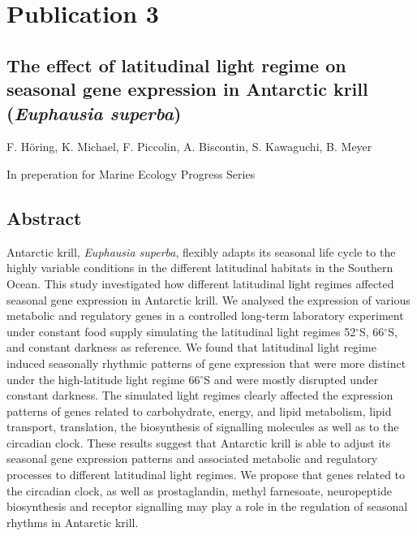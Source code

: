 
\chapter[Publication 3]{Publication 3} %

\label{ChapterX} %
\section*{The effect of latitudinal light regime on seasonal gene expression in Antarctic krill (\textit{Euphausia superba})}

F. Höring, K. Michael, F. Piccolin, A. Biscontin, S. Kawaguchi, B. Meyer

In preperation for Marine Ecology Progress Series

\section{Abstract}

Antarctic krill, \textit{Euphausia superba}, flexibly adapts its seasonal life
cycle to the highly variable conditions in the different latitudinal habitats
in the Southern Ocean. This study investigated how different latitudinal light
regimes affected seasonal gene expression in Antarctic krill. We analysed the
expression of various metabolic and regulatory genes in a controlled long-term
laboratory experiment under constant food supply simulating the latitudinal
light regimes 52$^{\circ}$S, 66$^{\circ}$S, and constant darkness as reference.
We found that latitudinal light regime induced seasonally rhythmic patterns of
gene expression that were more distinct under the high-latitude light regime
66$^{\circ}$S and were mostly disrupted under constant darkness. The simulated
light regimes clearly affected the expression patterns of genes related to
carbohydrate, energy, and lipid metabolism, lipid transport, translation, the
biosynthesis of signalling molecules as well as to the circadian clock. These
results suggest that Antarctic krill is able to adjust its seasonal gene
expression patterns and associated metabolic and regulatory processes to
different latitudinal light regimes. We propose that genes related to the
circadian clock, as well as prostaglandin, methyl farnesoate, neuropeptide
biosynthesis and receptor signalling may play a role in the regulation of
seasonal rhythms in Antarctic krill.


